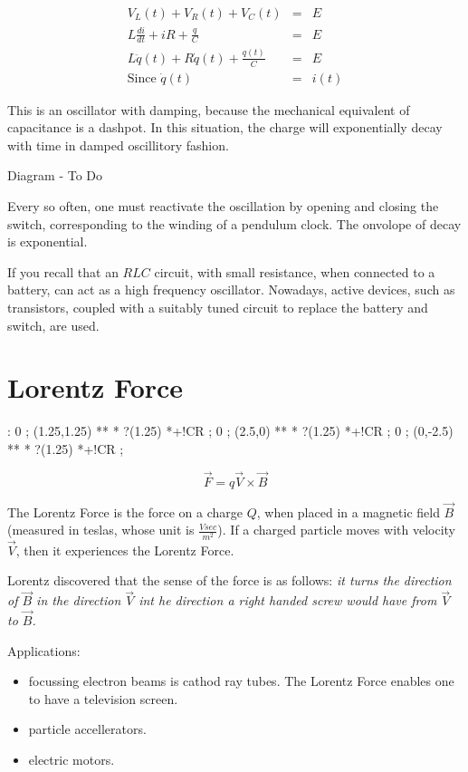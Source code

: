 \documentclass[a4paper,12pt]{article}
\begin{document}
\begin{eqnarray*}
V_{L}(t) + V_{R}(t) + V_{C}(t) & = & E \\
L \frac{di}{dt} + iR + \frac{q}{C} & = & E \\
L \ddot{q}(t) + R \dot{q}(t) + \frac{q(t)}{C} & = & E \\
\mbox{Since } \dot{q}(t) & = & i(t)
\end{eqnarray*}

This is an oscillator with damping, because the mechanical equivalent of
capacitance is a dashpot. In this situation, the charge will
exponentially decay with time in damped oscillitory fashion.

\begin{table}[hbtp]

Diagram - To Do

\end{table}

Every so often, one must reactivate the oscillation by opening and
closing the switch, corresponding to the winding of a pendulum clock.
The onvolope of decay is exponential.

If you recall that an $RLC$ circuit, with small resistance, when
connected to a battery, can act as a high frequency oscillator.
Nowadays, active devices, such as transistors, coupled with a suitably
tuned circuit to replace the battery and switch, are used.


\section{Lorentz Force}

\xy <1cm, 0cm>:
0 ; (1.25,1.25) **\dir{-} *\dir{>} ?(1.25) *+!CR{} ;
0 ; (2.5,0) **\dir{-} *\dir{>} ?(1.25) *+!CR{} ;
0 ; (0,-2.5) **\dir{-} *\dir{>} ?(1.25) *+!CR{} ;
\endxy

\[ \vec{F} = q \vec{V} \times \vec{B} \]

The Lorentz Force is the force on a charge $Q$, when placed in a
magnetic field $\vec{B}$ (measured in teslas, whose unit is $\frac{V
sec}{m^{2}}$). If a charged particle moves with velocity $\vec{V}$, then
it experiences the Lorentz Force.

Lorentz discovered that the sense of the force is as follows: \textit{it
turns the direction of $\vec{B}$ in the direction $\vec{V}$ int he
direction a right handed screw would have from $\vec{V}$ to $\vec{B}$.}

Applications: 

\begin{itemize}
\item focussing electron beams is cathod ray tubes. The Lorentz Force 
enables one to have a television screen.

\item particle accellerators.

\item electric motors.
\end{itemize}
\end{document}
